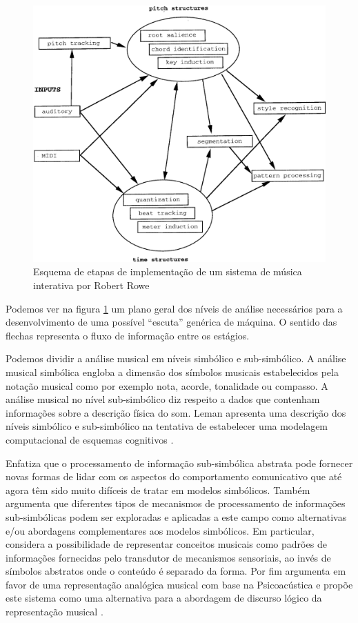 \documentclass[draft]{ppgmus}
\begin{document}
\begin{figure}
\includegraphics[scale=.25]{rowe}
\caption{Esquema de etapas de implementação de um sistema de música interativa por Robert Rowe}
\label{rowe}
\end{figure} 


Podemos ver na figura \ref{rowe} um plano geral dos níveis de análise necessários para a desenvolvimento
de uma possível ``escuta'' genérica de máquina. O sentido das flechas representa o fluxo de 
informação entre os estágios.


Podemos dividir a análise musical em níveis simbólico e sub-simbólico.
A análise musical simbólica engloba a dimensão dos símbolos musicais
estabelecidos pela notação musical como por exemplo nota, acorde, tonalidade ou compasso.
A análise musical no nível sub-simbólico diz respeito a dados que contenham informações sobre a 
descrição física do som. Leman apresenta uma descrição dos níveis simbólico e sub-simbólico 
na tentativa de estabelecer uma modelagem
computacional de esquemas cognitivos \cite{leman89}.

Enfatiza que o processamento de informação sub-simbólica abstrata pode fornecer novas formas de lidar com os aspectos
do comportamento comunicativo que até agora têm sido muito difíceis de tratar em modelos simbólicos.
Também argumenta que diferentes tipos de mecanismos de processamento de informações sub-simbólicas podem ser exploradas
e aplicadas a este campo como alternativas e/ou abordagens complementares aos modelos simbólicos.
Em particular, considera a possibilidade de representar conceitos musicais como padrões de
informações fornecidas pelo transdutor de mecanismos sensoriais, ao invés de símbolos abstratos onde o conteúdo
é separado da forma. Por fim argumenta em favor de uma representação analógica musical
com base na Psicoacústica e propõe este sistema como uma alternativa para a abordagem de discurso lógico da representação musical \cite{leman89}.
\end{document}
